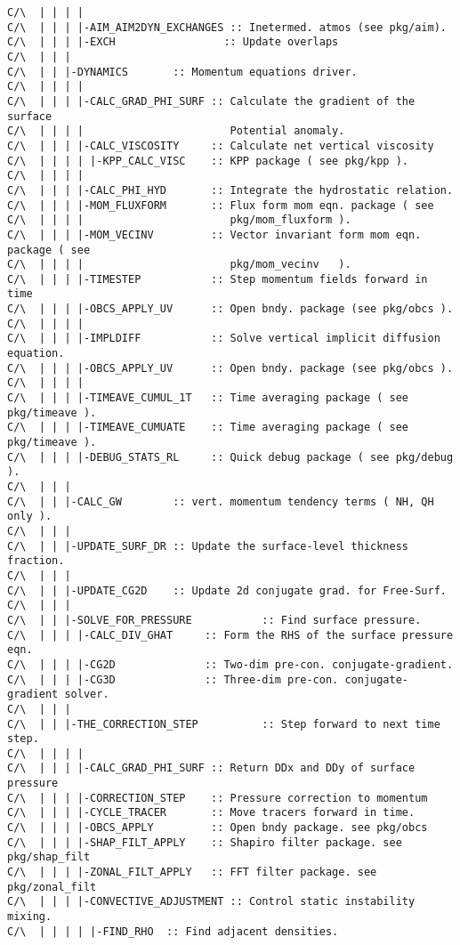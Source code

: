 {\begin{verbatim}
C/\  | | | |
C/\  | | | |-AIM_AIM2DYN_EXCHANGES :: Inetermed. atmos (see pkg/aim).
C/\  | | | |-EXCH                 :: Update overlaps
C/\  | | |
C/\  | | |-DYNAMICS       :: Momentum equations driver.
C/\  | | | |
C/\  | | | |-CALC_GRAD_PHI_SURF :: Calculate the gradient of the surface 
C/\  | | | |                       Potential anomaly.
C/\  | | | |-CALC_VISCOSITY     :: Calculate net vertical viscosity
C/\  | | | | |-KPP_CALC_VISC    :: KPP package ( see pkg/kpp ).
C/\  | | | |                                                      
C/\  | | | |-CALC_PHI_HYD       :: Integrate the hydrostatic relation.
C/\  | | | |-MOM_FLUXFORM       :: Flux form mom eqn. package ( see
C/\  | | | |                       pkg/mom_fluxform ).
C/\  | | | |-MOM_VECINV         :: Vector invariant form mom eqn. package ( see
C/\  | | | |                       pkg/mom_vecinv   ).
C/\  | | | |-TIMESTEP           :: Step momentum fields forward in time
C/\  | | | |-OBCS_APPLY_UV      :: Open bndy. package (see pkg/obcs ).
C/\  | | | |
C/\  | | | |-IMPLDIFF           :: Solve vertical implicit diffusion equation.
C/\  | | | |-OBCS_APPLY_UV      :: Open bndy. package (see pkg/obcs ).
C/\  | | | |
C/\  | | | |-TIMEAVE_CUMUL_1T   :: Time averaging package ( see pkg/timeave ).
C/\  | | | |-TIMEAVE_CUMUATE    :: Time averaging package ( see pkg/timeave ).
C/\  | | | |-DEBUG_STATS_RL     :: Quick debug package ( see pkg/debug ).
C/\  | | |
C/\  | | |-CALC_GW        :: vert. momentum tendency terms ( NH, QH only ).
C/\  | | |
C/\  | | |-UPDATE_SURF_DR :: Update the surface-level thickness fraction.
C/\  | | |
C/\  | | |-UPDATE_CG2D    :: Update 2d conjugate grad. for Free-Surf.
C/\  | | |
C/\  | | |-SOLVE_FOR_PRESSURE           :: Find surface pressure.
C/\  | | | |-CALC_DIV_GHAT     :: Form the RHS of the surface pressure eqn.
C/\  | | | |-CG2D              :: Two-dim pre-con. conjugate-gradient.
C/\  | | | |-CG3D              :: Three-dim pre-con. conjugate-gradient solver.
C/\  | | |
C/\  | | |-THE_CORRECTION_STEP          :: Step forward to next time step.
C/\  | | | |
C/\  | | | |-CALC_GRAD_PHI_SURF :: Return DDx and DDy of surface pressure
C/\  | | | |-CORRECTION_STEP    :: Pressure correction to momentum
C/\  | | | |-CYCLE_TRACER       :: Move tracers forward in time.
C/\  | | | |-OBCS_APPLY         :: Open bndy package. see pkg/obcs
C/\  | | | |-SHAP_FILT_APPLY    :: Shapiro filter package. see pkg/shap_filt
C/\  | | | |-ZONAL_FILT_APPLY   :: FFT filter package. see pkg/zonal_filt
C/\  | | | |-CONVECTIVE_ADJUSTMENT :: Control static instability mixing.
C/\  | | | | |-FIND_RHO  :: Find adjacent densities.

\end{verbatim}}
